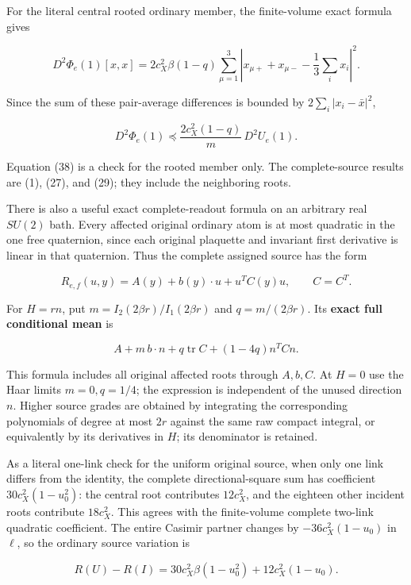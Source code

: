 \documentclass[
  11pt,
]{article}
\begin{document}
For the literal central rooted ordinary member, the finite-volume exact
formula gives

\[
 D^2\Phi_e(1)[x,x]
 =2c_X^2\beta(1-q)
 \sum_{\mu=1}^3\left|
 x_{\mu+}+x_{\mu-}-\frac13\sum_i x_i
 \right|^2.
                                                        \tag{38}
\]

Since the sum of these pair-average differences is bounded by
\(2\sum_i|x_i-\bar x|^2\),

\[
 D^2\Phi_e(1)\preceq
 \frac{2c_X^2(1-q)}m\,D^2U_e(1).                 \tag{39}
\]

Equation (38) is a check for the rooted member only. The complete-source
results are (1), (27), and (29); they include the neighboring roots.

There is also a useful exact complete-readout formula on an arbitrary
real \(SU(2)\) bath. Every affected original ordinary atom is at most
quadratic in the one free quaternion, since each original plaquette and
invariant first derivative is linear in that quaternion. Thus the
complete assigned source has the form

\[
 R_{e,f}(u,y)=A(y)+b(y)\cdot u+u^TC(y)u,
 \qquad C=C^T.
\]

For \(H=rn\), put \(m=I_2(2\beta r)/I_1(2\beta r)\) and
\(q=m/(2\beta r)\). Its \textbf{exact full conditional mean} is

\[
 A+m\,b\cdot n+q\operatorname{tr}C+(1-4q)n^TCn.   \tag{39a}
\]

This formula includes all original affected roots through \(A,b,C\). At
\(H=0\) use the Haar limits \(m=0,q=1/4\); the expression is independent
of the unused direction \(n\). Higher source grades are obtained by
integrating the corresponding polynomials of degree at most \(2r\)
against the same raw compact integral, or equivalently by its
derivatives in \(H\); its denominator is retained.

As a literal one-link check for the uniform original source, when only
one link differs from the identity, the complete directional-square sum
has coefficient \(30c_X^2(1-u_0^2)\): the central root contributes
\(12c_X^2\), and the eighteen other incident roots contribute
\(18c_X^2\). This agrees with the finite-volume complete two-link quadratic
coefficient. The entire Casimir partner changes by \(-36c_X^2(1-u_0)\)
in \(\ell\), so the ordinary source variation is

\[
 R(U)-R(I)=30c_X^2\beta(1-u_0^2)+12c_X^2(1-u_0).
                                                        \tag{40}
\]
\end{document}
